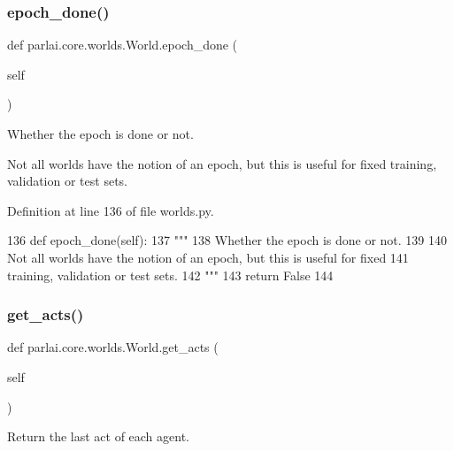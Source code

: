 \subsubsection{\texorpdfstring{epoch\+\_\+done()}{epoch\_done()}}
{\footnotesize\ttfamily def parlai.\+core.\+worlds.\+World.\+epoch\+\_\+done (\begin{DoxyParamCaption}\item[{}]{self }\end{DoxyParamCaption})}

\begin{DoxyVerb}Whether the epoch is done or not.

Not all worlds have the notion of an epoch, but this is useful for fixed
training, validation or test sets.
\end{DoxyVerb}
 

Definition at line 136 of file worlds.\+py.


\begin{DoxyCode}
136     \textcolor{keyword}{def }epoch\_done(self):
137         \textcolor{stringliteral}{"""}
138 \textcolor{stringliteral}{        Whether the epoch is done or not.}
139 \textcolor{stringliteral}{}
140 \textcolor{stringliteral}{        Not all worlds have the notion of an epoch, but this is useful for fixed}
141 \textcolor{stringliteral}{        training, validation or test sets.}
142 \textcolor{stringliteral}{        """}
143         \textcolor{keywordflow}{return} \textcolor{keyword}{False}
144 
\end{DoxyCode}
\mbox{\label{classparlai_1_1core_1_1worlds_1_1World_aa1d3c0cc946f5ade27373f7dc0bd77b5}} 
\subsubsection{\texorpdfstring{get\+\_\+acts()}{get\_acts()}}
{\footnotesize\ttfamily def parlai.\+core.\+worlds.\+World.\+get\+\_\+acts (\begin{DoxyParamCaption}\item[{}]{self }\end{DoxyParamCaption})}

\begin{DoxyVerb}Return the last act of each agent.
\end{DoxyVerb}
 

